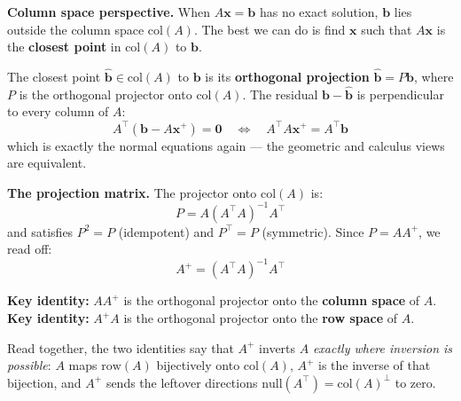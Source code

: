 \documentclass[12pt, a4paper]{article}
\theoremstyle{definition}
\begin{document}
\textbf{Column space perspective.} When $A\mathbf{x} = \mathbf{b}$ has no exact solution, $\mathbf{b}$ lies outside the column space $\text{col}(A)$. The best we can do is find $\mathbf{x}$ such that $A\mathbf{x}$ is the \textbf{closest point} in $\text{col}(A)$ to $\mathbf{b}$.

\begin{center}
\end{center}

The closest point $\hat{\mathbf{b}} \in \text{col}(A)$ to $\mathbf{b}$ is its \textbf{orthogonal projection} $\hat{\mathbf{b}} = P\mathbf{b}$, where $P$ is the orthogonal projector onto $\text{col}(A)$. The residual $\mathbf{b} - \hat{\mathbf{b}}$ is perpendicular to every column of $A$:
\[
    A^\top(\mathbf{b} - A\mathbf{x}^+) = \mathbf{0} \quad \Longleftrightarrow \quad A^\top A \mathbf{x}^+ = A^\top \mathbf{b}
\]
which is exactly the normal equations again — the geometric and calculus views are equivalent.

\textbf{The projection matrix.} The projector onto $\text{col}(A)$ is:
\[
    P = A(A^\top A)^{-1} A^\top
\]
and satisfies $P^2 = P$ (idempotent) and $P^\top = P$ (symmetric). Since $P = AA^+$, we read off:
\[
    A^+ = (A^\top A)^{-1} A^\top
\]

\begin{keybox}
\textbf{Key identity:} $AA^+$ is the orthogonal projector onto the \textbf{column space} of $A$. \\
\textbf{Key identity:} $A^+A$ is the orthogonal projector onto the \textbf{row space} of $A$.
\end{keybox}

Read together, the two identities say that $A^+$ inverts $A$ \emph{exactly where inversion is possible}: $A$ maps $\text{row}(A)$ bijectively onto $\text{col}(A)$, $A^+$ is the inverse of that bijection, and $A^+$ sends the leftover directions $\text{null}(A^\top) = \text{col}(A)^\perp$ to zero.
\end{document}
